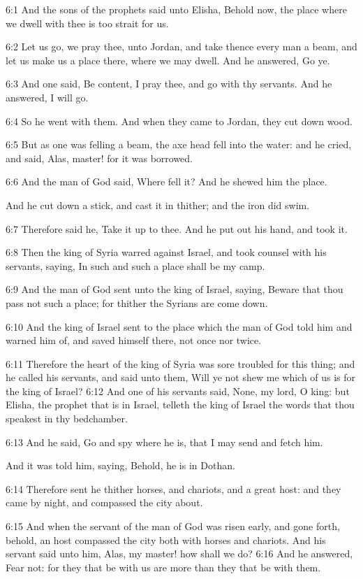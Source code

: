 6:1 And the sons of the prophets said unto Elisha, Behold now, the
place where we dwell with thee is too strait for us.

6:2 Let us go, we pray thee, unto Jordan, and take thence every man a
beam, and let us make us a place there, where we may dwell. And he
answered, Go ye.

6:3 And one said, Be content, I pray thee, and go with thy servants.
And he answered, I will go.

6:4 So he went with them. And when they came to Jordan, they cut down
wood.

6:5 But as one was felling a beam, the axe head fell into the water:
and he cried, and said, Alas, master! for it was borrowed.

6:6 And the man of God said, Where fell it? And he shewed him the
place.

And he cut down a stick, and cast it in thither; and the iron did
swim.

6:7 Therefore said he, Take it up to thee. And he put out his hand,
and took it.

6:8 Then the king of Syria warred against Israel, and took counsel
with his servants, saying, In such and such a place shall be my camp.

6:9 And the man of God sent unto the king of Israel, saying, Beware
that thou pass not such a place; for thither the Syrians are come
down.

6:10 And the king of Israel sent to the place which the man of God
told him and warned him of, and saved himself there, not once nor
twice.

6:11 Therefore the heart of the king of Syria was sore troubled for
this thing; and he called his servants, and said unto them, Will ye
not shew me which of us is for the king of Israel?  6:12 And one of
his servants said, None, my lord, O king: but Elisha, the prophet that
is in Israel, telleth the king of Israel the words that thou speakest
in thy bedchamber.

6:13 And he said, Go and spy where he is, that I may send and fetch
him.

And it was told him, saying, Behold, he is in Dothan.

6:14 Therefore sent he thither horses, and chariots, and a great host:
and they came by night, and compassed the city about.

6:15 And when the servant of the man of God was risen early, and gone
forth, behold, an host compassed the city both with horses and
chariots. And his servant said unto him, Alas, my master! how shall we
do?  6:16 And he answered, Fear not: for they that be with us are more
than they that be with them.

